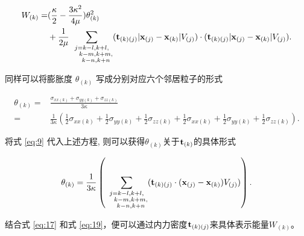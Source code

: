 {\begin{equation}
\begin{aligned}
W_{(k)} =& (\frac{\kappa}{2} -\frac{3\kappa^2}{4\mu})\theta_{(k)}^2 \\
         &+\frac{1}{2\mu}\sum_{\substack {j=k-l,k+l,\\ \quad k-m,k+m,\\ \quad k-n,k+n}}(\mathbf{t}_{(k)(j)}|\mathbf{x}_{(j)}-\mathbf{x}_{(k)}|V_{(j)})\cdot(\mathbf{t}_{(k)(j)}|\mathbf{x}_{(j)}-\mathbf{x}_{(k)}|V_{(j)}).
\end{aligned}
\label{eq:17}
\end{equation}

同样可以将膨胀度 $\theta_{(k)}$ 写成分别对应六个邻居粒子的形式

\begin{equation}
\begin{aligned}
\theta_{(k)} =& \frac{\sigma_{xx(k)}+\sigma_{yy(k)}+\sigma_{zz(k)}}{3\kappa}\\
        =& \frac{1}{3\kappa}(\frac{1}{2}\sigma_{xx(k)}+\frac{1}{2}\sigma_{yy(k)}+\frac{1}{2}\sigma_{zz(k)}
         + \frac{1}{2}\sigma_{xx(k)}+\frac{1}{2}\sigma_{yy(k)}+\frac{1}{2}\sigma_{zz(k)}).
\end{aligned}
\label{eq:18}
\end{equation}

将式 \ref{eq:9} 代入上述方程, 则可以获得$\theta_{(k)}$关于$\mathbf{t}_{(k)}$的具体形式

\begin{equation}
\theta_{(k)} = \frac{1}{3\kappa}\left(\sum_{\substack {j=k-l,k+l,\\ \quad k-m,k+m,\\ \quad k-n,k+n}}(\mathbf{t}_{(k)(j)}\cdot(\mathbf{x}_{(j)}-\mathbf{x}_{(k)})V_{(j)})\right).
\label{eq:19}
\end{equation}

结合式 \ref{eq:17} 和式 \ref{eq:19}，便可以通过内力密度$\mathbf{t}_{(k)(j)}$来具体表示能量$W_{(k)}$。

}
